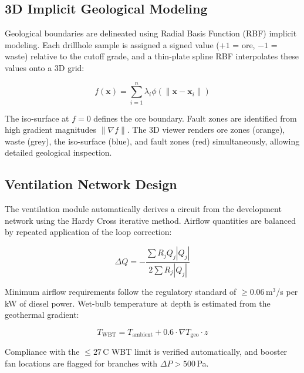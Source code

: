 \documentclass[12pt,a4paper]{article}
\begin{document}
\subsection{3D Implicit Geological Modeling}
\label{sec:implicit}

Geological boundaries are delineated using Radial Basis Function (RBF) implicit modeling. Each drillhole sample is assigned a signed value ($+1$ = ore, $-1$ = waste) relative to the cutoff grade, and a thin-plate spline RBF interpolates these values onto a 3D grid:

\begin{equation}
  f(\mathbf{x}) = \sum_{i=1}^{n} \lambda_i \phi(\|\mathbf{x} - \mathbf{x}_i\|)
\end{equation}

The iso-surface at $f = 0$ defines the ore boundary. Fault zones are identified from high gradient magnitudes $\|\nabla f\|$. The 3D viewer renders ore zones (orange), waste (grey), the iso-surface (blue), and fault zones (red) simultaneously, allowing detailed geological inspection.

\subsection{Ventilation Network Design}
\label{sec:ventilation}

The ventilation module automatically derives a circuit from the development network using the Hardy Cross iterative method. Airflow quantities are balanced by repeated application of the loop correction:

\begin{equation}
  \Delta Q = -\frac{\sum R_j Q_j |Q_j|}{2 \sum R_j |Q_j|}
\end{equation}

Minimum airflow requirements follow the regulatory standard of $\geq 0.06$\,m$^3$/s per kW of diesel power. Wet-bulb temperature at depth is estimated from the geothermal gradient:

\begin{equation}
  T_{\text{WBT}} = T_{\text{ambient}} + 0.6 \cdot \nabla T_{\text{geo}} \cdot z
\end{equation}

Compliance with the $\leq 27$\,\textdegree C WBT limit is verified automatically, and booster fan locations are flagged for branches with $\Delta P > 500$\,Pa.
\end{document}
